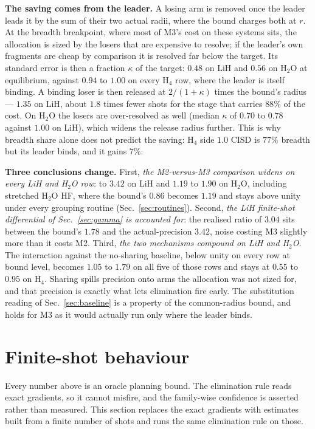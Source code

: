 \documentclass[10pt]{article}
\begin{document}
\textbf{The saving comes from the leader.} A losing arm is removed once the leader
leads it by the sum of their two actual radii, where the bound charges both at $r$.
At the breadth breakpoint, where most of M3's cost on these systems sits, the
allocation is sized by the losers that are expensive to resolve; if the leader's
own fragments are cheap by comparison it is resolved far below the target. Its
standard error is then a fraction $\kappa$ of the target: $0.48$ on LiH and $0.56$ on
H$_2$O at equilibrium, against $0.94$ to $1.00$ on every H$_4$ row, where the
leader is itself binding. A binding loser is then released at $2/(1+\kappa)$ times
the bound's radius --- $1.35$ on LiH, about $1.8$ times fewer shots for the stage
that carries $88\%$ of the cost. On H$_2$O the losers are over-resolved as well
(median $\kappa$ of $0.70$ to $0.78$ against $1.00$ on LiH), which widens the
release radius further. This is why breadth share alone does not predict the
saving: H$_4$ side $1.0$ CISD is $77\%$ breadth but its leader binds, and it
gains $7\%$.

\textbf{Three conclusions change.} First, \emph{the M2-versus-M3 comparison
widens on every LiH and H$_2$O row}: to $3.42$ on LiH and $1.19$ to $1.90$ on
H$_2$O, including stretched H$_2$O HF, where the bound's $0.86$ becomes $1.19$ and
stays above unity under every grouping routine (Sec.~\ref{sec:routines}).
Second, \emph{the LiH finite-shot differential of Sec.~\ref{sec:gamma} is
accounted for}: the realised ratio of $3.04$ sits between the bound's $1.78$ and
the actual-precision $3.42$, noise costing M3 slightly more than it costs M2.
Third, \emph{the two mechanisms compound on LiH and H$_2$O}. The interaction
against the no-sharing baseline, below unity on every row at bound level, becomes
$1.05$ to $1.79$ on all five of those rows and stays at $0.55$ to $0.95$ on H$_4$.
Sharing spills precision onto arms the allocation was not sized for, and that
precision is exactly what lets elimination fire early. The substitution reading of
Sec.~\ref{sec:baseline} is a property of the common-radius bound, and holds for
M3 as it would actually run only where the leader binds.

\section{Finite-shot behaviour}
\label{sec:finite-shot}

Every number above is an oracle planning bound. The elimination rule reads exact
gradients, so it cannot misfire, and the family-wise confidence is asserted rather
than measured. This section replaces the exact gradients with estimates built from
a finite number of shots and runs the same elimination rule on those.
\end{document}
